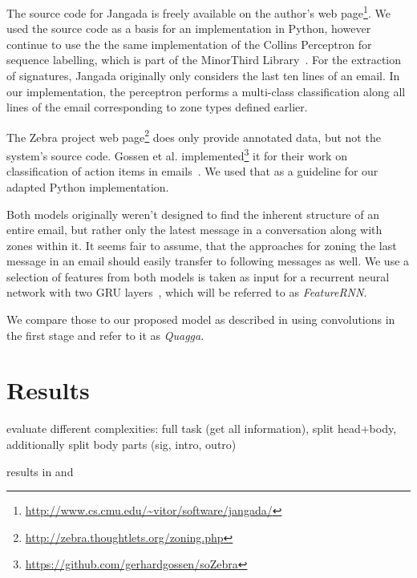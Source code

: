 \documentclass{llncs}
\begin{document}
The source code for Jangada is freely available on the author's web page\footnote{\url{http://www.cs.cmu.edu/~vitor/software/jangada/}}.
We used the source code as a basis for an implementation in Python, however continue to use the the same implementation of the Collins Perceptron for sequence labelling, which is part of the MinorThird Library~\cite{minorthird,cperceptron}.
For the extraction of signatures, Jangada originally only considers the last ten lines of an email.
In our implementation, the perceptron performs a multi-class classification along all lines of the email corresponding to zone types defined earlier.

The Zebra project web page\footnote{\url{http://zebra.thoughtlets.org/zoning.php}} does only provide annotated data, but not the system's source code. 
Gossen et al. implemented\footnote{\url{https://github.com/gerhardgossen/soZebra}} it for their work on classification of action items in emails~\cite{sozebra}.
We used that as a guideline for our adapted Python implementation.

Both models originally weren't designed to find the inherent structure of an entire email, but rather only the latest message in a conversation along with zones within it.
It seems fair to assume, that the approaches for zoning the last message in an email should easily transfer to following messages as well.
We use a selection of features from both models is taken as input for a recurrent neural network with two GRU layers~\cite{gru}, which will be referred to as \textit{FeatureRNN}.

We compare those to our proposed model as described in  using convolutions in the first stage and refer to it as \textit{Quagga}.



\section{Results}
evaluate different complexities: full task (get all information), split head+body, additionally split body parts (sig, intro, outro)

results in  and 
\end{document}
